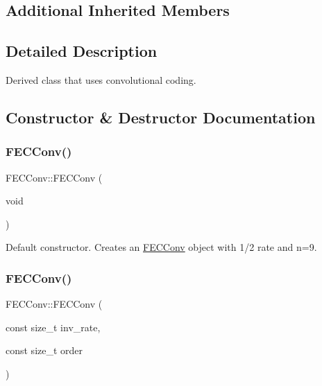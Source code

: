 \subsection*{Additional Inherited Members}


\subsection{Detailed Description}
Derived class that uses convolutional coding. 

\subsection{Constructor \& Destructor Documentation}
\mbox{\label{classFECConv_ac0159362b45b9f7840e3bf7223cd6e48}} 
\subsubsection{\texorpdfstring{F\+E\+C\+Conv()}{FECConv()}\hspace{0.1cm}{\footnotesize\ttfamily [1/2]}}
{\footnotesize\ttfamily F\+E\+C\+Conv\+::\+F\+E\+C\+Conv (\begin{DoxyParamCaption}\item[{void}]{ }\end{DoxyParamCaption})\hspace{0.3cm}{\ttfamily [inline]}}

Default constructor. Creates an \hyperlink{classFECConv}{F\+E\+C\+Conv} object with 1/2 rate and n=9. \mbox{\label{classFECConv_a884d27178ca0484f4692b78fa31fd898}} 
\subsubsection{\texorpdfstring{F\+E\+C\+Conv()}{FECConv()}\hspace{0.1cm}{\footnotesize\ttfamily [2/2]}}
{\footnotesize\ttfamily F\+E\+C\+Conv\+::\+F\+E\+C\+Conv (\begin{DoxyParamCaption}\item[{const size\+\_\+t}]{inv\+\_\+rate,  }\item[{const size\+\_\+t}]{order }\end{DoxyParamCaption})}

